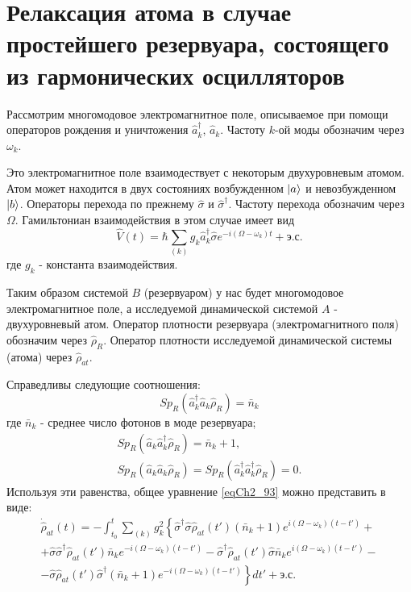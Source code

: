 \section{Релаксация атома в случае простейшего
  резервуара, состоящего из гармонических осцилляторов}
Рассмотрим многомодовое электромагнитное поле, описываемое при помощи
операторов рождения и уничтожения $\hat{a}_k^{\dag}$,
$\hat{a}_k$. Частоту $k$-ой моды обозначим через $\omega_k$. 

Это электромагнитное поле взаимодествует с некоторым двухуровневым
атомом. Атом может находится в двух состояниях 
возбужденном $\ket{a}$ и невозбужденном
$\ket{b}$. Операторы перехода по прежнему 
$\hat{\sigma}$ и $\hat{\sigma}^{\dag}$. Частоту перехода обозначим через
$\Omega$. Гамильтониан взаимодействия в этом случае имеет вид  
\begin{equation}
\hat{V}\left(t\right) = \hbar
\sum_{(k)} g_k \hat{a}_k^{\dag} \hat{\sigma}e^{-i \left(
\Omega - \omega_k
\right) t} +
\mbox{э.с.}
\label{eqCh2_94}
\end{equation}
где $g_k$ - константа взаимодействия.

Таким образом системой $B$ (резервуаром) у нас будет многомодовое
электромагнитное поле, а исследуемой динамической системой $A$ -
двухуровневый атом. Оператор плотности резервуара (электромагнитного
поля) обозначим через $\hat{\rho}_R$. Оператор плотности исследуемой
динамической системы (атома) через $\hat{\rho}_{at}$.

Справедливы следующие соотношения:
\begin{equation}
Sp_R\left(
\hat{a}_k^{\dag}
\hat{a}_k
\hat{\rho}_R
\right) = \bar{n}_k
\label{eqCh2_96}
\end{equation}
где $\bar{n}_k$ -
среднее число фотонов в моде резервуара; 
\begin{eqnarray}
Sp_R\left(\hat{a}_k\hat{a}_k^{\dag}\hat{\rho}_R\right) = \bar{n}_k + 1,
\nonumber \\
Sp_R\left(\hat{a}_k\hat{a}_k\hat{\rho}_R\right) = 
Sp_R\left(\hat{a}_k^{\dag}\hat{a}_k^{\dag}\hat{\rho}_R\right) = 0.
\label{eqCh2_96_add}
\end{eqnarray}
Используя эти равенства, общее уравнение
\eqref{eqCh2_93} можно представить в виде:  
\begin{eqnarray}
\dot{\hat{\rho}}_{at}\left(t\right) = 
- \int_{t_0}^t\sum_{(k)}g_k^2
\left\{
\hat{\sigma}^{\dag} \hat{\sigma}\hat{\rho}_{at}\left(t'\right)
\left(
\bar{n}_k + 1
\right)
e^{i\left(\Omega - \omega_k\right)
\left(t - t'\right)}
+
\right.
\nonumber \\
\left.
+\hat{\sigma}\hat{\sigma}^{\dag}
\hat{\rho}_{at}\left(t'\right)
\bar{n}_k
e^{-i\left(\Omega - \omega_k\right)
\left(t - t'\right)} -
\hat{\sigma}^{\dag}
\hat{\rho}_{at}\left(t'\right)
\hat{\sigma}
\bar{n}_k
e^{i\left(\Omega - \omega_k\right)
\left(t - t'\right)}
-
\right.
\nonumber \\
-
\left.
\hat{\sigma}
\hat{\rho}_{at}\left(t'\right)
\hat{\sigma}^{\dag}
\left(\bar{n}_k + 1\right)
e^{-i\left(\Omega - \omega_k\right)
\left(t - t'\right)}
\right\}dt'
+ \mbox{э.с.}
\label{eqCh2_97}
\end{eqnarray}

